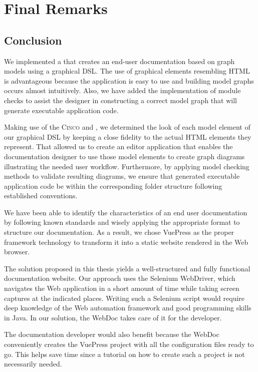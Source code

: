 \chapter{Final Remarks}\label{ch:epilogue}

\section{Conclusion}\label{sec:concl}

We implemented a  that creates an end-user documentation based on graph models using a graphical DSL. The use of graphical elements resembling HTML is advantageous because the application is easy to use and building model graphs occurs almost intuitively. Also, we have added the implementation of module checks to assist the designer in constructing a correct model graph that will generate executable application code.

Making use of the \textsc{Cinco}  and , we determined the look of each model element of our graphical DSL by keeping a close fidelity to the actual HTML elements they represent. That allowed us to create an editor application that enables the documentation designer to use those model elements to create graph diagrams illustrating the needed user workflow. Furthermore, by applying model checking methods to validate resulting diagrams, we ensure that generated executable application code be within the corresponding folder structure following established conventions.

We have been able to identify the characteristics of an end user documentation by following known standards and wisely applying the appropriate format to structure our documentation. As a result, we chose VuePress as the proper framework technology to transform it into a static website rendered in the Web browser.

The solution proposed in this thesis yields a well-structured and fully functional documentation website. Our approach uses the Selenium WebDriver, which navigates the Web application in a short amount of time while taking screen captures at the indicated places. Writing such a Selenium script would require deep knowledge of the Web automation framework and good programming skills in Java. In our solution, the WebDoc takes care of it for the developer.

The documentation developer would also benefit because the WebDoc conveniently creates the VuePress project with all the configuration files ready to go. This helps save time since a tutorial on how to create such a project is not necessarily needed.

